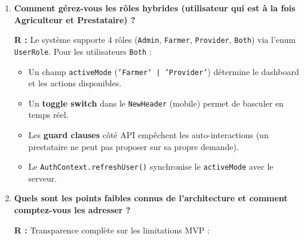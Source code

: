 \documentclass[12pt, a4paper]{article}
\begin{document}
\begin{enumerate}[leftmargin=2em, label=\textbf{Q\arabic*.}]
\textbf{Roadmap :} Implémentation de \textbf{signed uploads} Cloudinary avec validation côté serveur et \textbf{transformation automatique} (compression, redimensionnement).

\vspace{0.5em}

\item \textbf{Comment gérez-vous les rôles hybrides (utilisateur qui est à la fois Agriculteur et Prestataire) ?}

\textbf{R :} Le système supporte 4 rôles (\texttt{Admin}, \texttt{Farmer}, \texttt{Provider}, \texttt{Both}) via l'enum \texttt{UserRole}. Pour les utilisateurs \texttt{Both} :
\begin{itemize}
  \item Un champ \texttt{activeMode} (\texttt{'Farmer' | 'Provider'}) détermine le dashboard et les actions disponibles.
  \item Un \textbf{toggle switch} dans le \texttt{NewHeader} (mobile) permet de basculer en temps réel.
  \item Les \textbf{guard clauses} côté API empêchent les auto-interactions (un prestataire ne peut pas proposer sur sa propre demande).
  \item Le \texttt{AuthContext.refreshUser()} synchronise le \texttt{activeMode} avec le serveur.
\end{itemize}

\vspace{0.5em}

\item \textbf{Quels sont les points faibles connus de l'architecture et comment comptez-vous les adresser ?}

\textbf{R :} Transparence complète sur les limitations MVP :


\end{enumerate}
\end{document}
